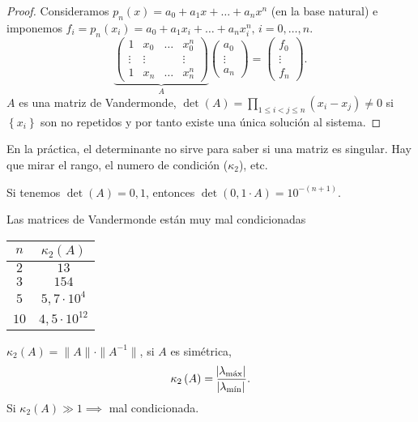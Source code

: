 \begin{proof}
    Consideramos $p_n\left( x \right) = a_0+a_1x+ \dots+a_n x^n$ (en la base natural) e imponemos $f_i = p_n\left( x_i \right) = a_0 + a_1 x_i + \dots + a_n x_i^n,\, i = 0,\dots,n$.
    \[
        \underbrace{
        \begin{pmatrix}
            1 & x_0 & \dots & x_0^n \\
            \vdots & \vdots & & \vdots \\
            1 & x_n & \dots & x_n^n
        \end{pmatrix}}_A
        \begin{pmatrix}
            a_0 \\
            \vdots \\
            a_n
        \end{pmatrix}
        =
        \begin{pmatrix}
            f_0 \\
            \vdots \\
            f_n
        \end{pmatrix}.
    \]
    $A$ es una matriz de Vandermonde, $\det\left( A \right) = \prod\limits_{1\leq i < j\leq n} \left( x_i-x_j \right) \neq 0$ si $\left\{ x_i \right\}$ son no repetidos y por tanto existe una única solución al sistema.
\end{proof}

\begin{obs}
    En la práctica, el determinante no sirve para saber si una matriz es singular. Hay que mirar el rango, el numero de condición ($\kappa_2$), etc.
\end{obs}

\begin{example}
    Si tenemos $\det\left( A \right) = 0,1$, entonces $\det\left( 0,1\cdot A \right) = 10^{-(n+1)}$.
\end{example}

\begin{obs}
    Las matrices de Vandermonde están muy mal condicionadas
    \begin{center}
        \begin{tabular}{|c|c|}\hline
            $n$ & $\kappa_2\left( A \right)$ \\ \hline \hline
            $2$ & $13$ \\ \hline
            $3$ & $154$ \\ \hline
            $5$ & $5,7\cdot 10^4$ \\ \hline
            $10$ & $4,5 \cdot 10^{12}$ \\ \hline 
        \end{tabular}
    \end{center}
    $\kappa_2\left( A \right) = \|A\|\cdot \|A^{-1}\|$, si $A$ es simétrica,
    \[
        \kappa_2\left( A \right) = \frac{\abs{\lambda_{\text{máx}}}}{\abs{\lambda_{\text{mín}}}}.
    \]
    Si $\kappa_2\left( A \right) \gg 1 \implies$ mal condicionada.
\end{obs}

